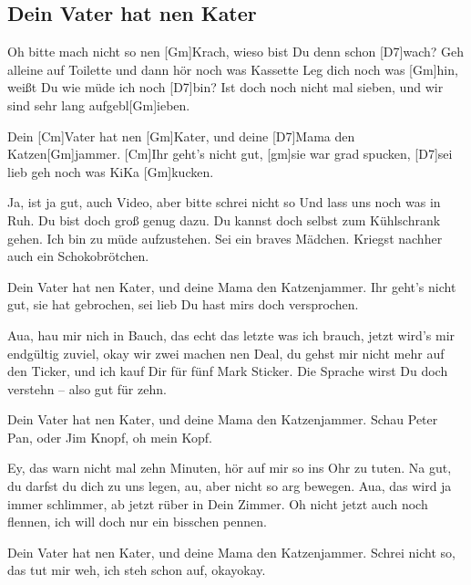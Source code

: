 \subsection*{Dein Vater hat nen Kater   }
\begin{guitar}
Oh bitte mach nicht so nen [Gm]Krach, wieso bist Du denn schon [D7]wach?
Geh alleine auf Toilette und dann hör noch was Kassette
Leg dich noch was [Gm]hin, weißt Du wie müde ich noch [D7]bin?
Ist doch noch nicht mal sieben, und wir sind sehr lang aufgebl[Gm]ieben.



Dein [Cm]Vater hat nen [Gm]Kater, und deine [D7]Mama den Katzen[Gm]jammer.
[Cm]Ihr geht’s nicht gut, [gm]sie war grad spucken, [D7]sei lieb geh noch was KiKa [Gm]kucken.



Ja, ist ja gut, auch Video, aber bitte schrei nicht so
Und lass uns noch was in Ruh. Du bist doch groß genug dazu.
Du kannst doch selbst zum Kühlschrank gehen. Ich bin zu müde aufzustehen.
Sei ein braves Mädchen. Kriegst nachher auch ein Schokobrötchen.



Dein Vater hat nen Kater, und deine Mama den Katzenjammer.
Ihr geht’s nicht gut, sie hat gebrochen, sei lieb Du hast mirs doch versprochen.



Aua, hau mir nich in Bauch, das echt das letzte was ich brauch,
jetzt wird’s mir endgültig zuviel, okay wir zwei machen nen Deal,
du gehst mir nicht mehr auf den Ticker, und ich kauf Dir für fünf Mark Sticker.
Die Sprache wirst Du doch verstehn – also gut für zehn.



Dein Vater hat nen Kater, und deine Mama den Katzenjammer.
Schau Peter Pan, oder Jim Knopf, oh mein Kopf.



Ey, das warn nicht mal zehn Minuten, hör auf mir so ins Ohr zu tuten.
Na gut, du darfst du dich zu uns legen, au, aber nicht so arg bewegen.
Aua, das wird ja immer schlimmer, ab jetzt rüber in Dein Zimmer.
Oh nicht jetzt auch noch flennen, ich will doch nur ein bisschen pennen.



Dein Vater hat nen Kater, und deine Mama den Katzenjammer.
Schrei nicht so, das tut mir weh, ich steh schon auf, okayokay. 
\end{guitar}
